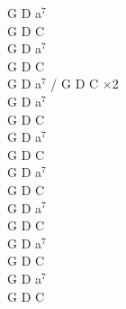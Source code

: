 \documentclass[a5paper, 10pt]{book}
\begin{document}
\begin{minipage}[t]{0.3\textwidth}
G D a$^7$\\
G D C\\
G D a$^7$\\
G D C\\

G D a$^7$ / G D C $\times$2\\

G D a$^7$\\
G D C\\
G D a$^7$\\
G D C\\

G D a$^7$\\
G D C\\
G D a$^7$\\
G D C\\

G D a$^7$\\
G D C\\
G D a$^7$\\
G D C\\

\end{minipage}

\newpage
\end{document}
